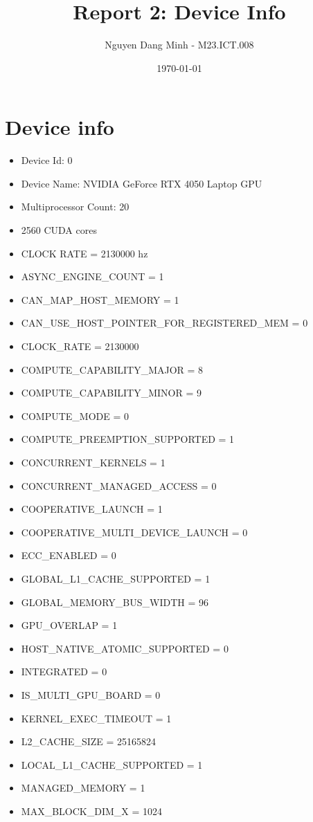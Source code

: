 \documentclass{article}
\title{Report 2: Device Info}
\author{Nguyen Dang Minh - M23.ICT.008}
\date{\today}
\begin{document}
\maketitle
\section{Device info}
\begin{itemize}
    \item Device Id: 0
    \item Device Name: NVIDIA GeForce RTX 4050 Laptop GPU
    \item Multiprocessor Count: 20
    \item 2560 CUDA cores
    \item CLOCK RATE = 2130000 hz
    \item ASYNC\_ENGINE\_COUNT = 1
    \item CAN\_MAP\_HOST\_MEMORY = 1
    \item CAN\_USE\_HOST\_POINTER\_FOR\_REGISTERED\_MEM = 0
    \item CLOCK\_RATE = 2130000
    \item COMPUTE\_CAPABILITY\_MAJOR = 8
    \item COMPUTE\_CAPABILITY\_MINOR = 9
    \item COMPUTE\_MODE = 0
    \item COMPUTE\_PREEMPTION\_SUPPORTED = 1
    \item CONCURRENT\_KERNELS = 1
    \item CONCURRENT\_MANAGED\_ACCESS = 0
    \item COOPERATIVE\_LAUNCH = 1
    \item COOPERATIVE\_MULTI\_DEVICE\_LAUNCH = 0
    \item ECC\_ENABLED = 0
    \item GLOBAL\_L1\_CACHE\_SUPPORTED = 1
    \item GLOBAL\_MEMORY\_BUS\_WIDTH = 96
    \item GPU\_OVERLAP = 1
    \item HOST\_NATIVE\_ATOMIC\_SUPPORTED = 0
    \item INTEGRATED = 0
    \item IS\_MULTI\_GPU\_BOARD = 0
    \item KERNEL\_EXEC\_TIMEOUT = 1
    \item L2\_CACHE\_SIZE = 25165824
    \item LOCAL\_L1\_CACHE\_SUPPORTED = 1
    \item MANAGED\_MEMORY = 1
    \item MAX\_BLOCK\_DIM\_X = 1024

\end{itemize}
\end{document}
